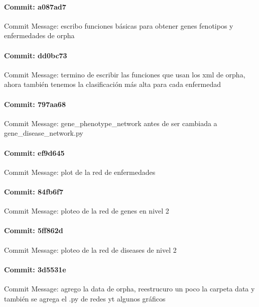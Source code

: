 \documentclass{article}
\begin{document}
\paragraph{Commit: a087ad7}
Commit Message: escribo funciones básicas para obtener genes fenotipos y enfermedades de orpha

\paragraph{Commit: dd0bc73}
Commit Message: termino de escribir las funciones que usan los xml de orpha, ahora también tenemos la clasificación más alta para cada enfermedad

\paragraph{Commit: 797aa68}
Commit Message: gene_phenotype_network antes de ser cambiada a gene_disease_network.py

\paragraph{Commit: ef9d645}
Commit Message: plot de la red de enfermedades

\paragraph{Commit: 84fb6f7}
Commit Message: ploteo de la red de genes en nivel 2

\paragraph{Commit: 5ff862d}
Commit Message: ploteo de la red de diseases de nivel 2

\paragraph{Commit: 3d5531e}
Commit Message: agrego la data de orpha, reestrucuro un poco la carpeta data y también se agrega el .py de redes yt algunos gráficos

\end{document}
